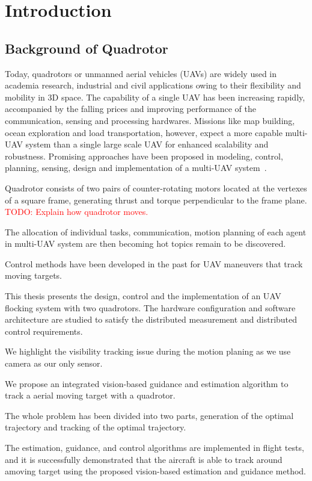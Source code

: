 \chapter{Introduction}\label{introduction}

\section{Background of Quadrotor}

Today, quadrotors or unmanned aerial vehicles (UAVs) are widely used in academia research, industrial and civil applications owing to their flexibility and mobility in 3D space. The capability of a single UAV has been increasing rapidly, accompanied by the falling prices and improving performance of the communication, sensing and processing hardwares. Missions like map building, ocean exploration and load transportation, however, expect a more capable multi-UAV system than a single large scale UAV for enhanced scalability and robustness. Promising approaches have been proposed in modeling, control, planning, sensing, design and implementation of a multi-UAV system~\cite{Swarm2018}.

Quadrotor consists of two pairs of counter-rotating motors located at the vertexes of a square frame, generating thrust and torque perpendicular to the frame plane. \textcolor{red}{TODO: Explain how quadrotor moves.}

The allocation of individual tasks, communication, motion planning of each agent in multi-UAV system are then becoming hot topics remain to be discovered.

Control methods have been developed in the past for UAV maneuvers that track moving targets.

This thesis presents the design, control and the implementation of an UAV flocking system with two quadrotors. The hardware configuration and software architecture are studied to satisfy the distributed measurement and distributed control requirements.

We highlight the visibility tracking issue during the motion planing as we use camera as our only sensor.

We propose an integrated vision-based guidance and estimation algorithm to track a aerial moving target with a quadrotor.

The whole problem has been divided into two parts, generation of the optimal trajectory and tracking of the optimal trajectory.

The estimation, guidance, and control algorithms are implemented in flight tests, and it is successfully demonstrated that the aircraft is able to track around amoving target using the proposed vision-based estimation and guidance method.


